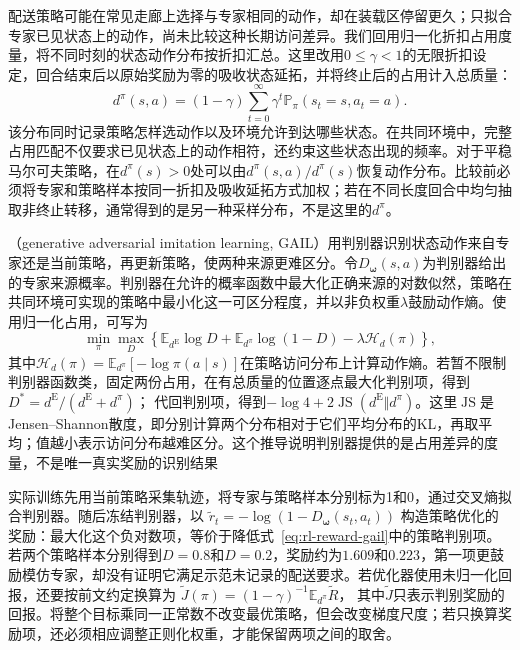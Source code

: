 配送策略可能在常见走廊上选择与专家相同的动作，却在装载区停留更久；只拟合专家已见状态上的动作，尚未比较这种长期访问差异。我们回用归一化折扣占用度量，将不同时刻的状态动作分布按折扣汇总。这里改用$0\leq\gamma<1$的无限折扣设定，回合结束后以原始奖励为零的吸收状态延拓，并将终止后的占用计入总质量：
\begin{equation}
  d^\pi(s,a)=(1-\gamma)\sum_{t=0}^{\infty}
       \gamma^t\mathbb P_\pi(s_t=s,a_t=a).
  \label{eq:rl-reward-occupancy}
\end{equation}
该分布同时记录策略怎样选动作以及环境允许到达哪些状态。在共同环境中，完整占用匹配不仅要求已见状态上的动作相符，还约束这些状态出现的频率。对于平稳马尔可夫策略，在$d^\pi(s)>0$处可以由$d^\pi(s,a)/d^\pi(s)$恢复动作分布。比较前必须将专家和策略样本按同一折扣及吸收延拓方式加权；若在不同长度回合中均匀抽取非终止转移，通常得到的是另一种采样分布，不是这里的$d^\pi$。

（generative adversarial imitation learning, GAIL）用判别器识别状态动作来自专家还是当前策略，再更新策略，使两种来源更难区分。令$D_{\bm{\omega}}(s,a)$为判别器给出的专家来源概率。判别器在允许的概率函数中最大化正确来源的对数似然，策略在共同环境可实现的策略中最小化这一可区分程度，并以非负权重$\lambda$鼓励动作熵。使用归一化占用，可写为
\begin{equation}
  \min_\pi\max_D
  \left\{\mathbb E_{d^{\mathrm E}}\log D
    +\mathbb E_{d^\pi}\log(1-D)
    -\lambda\mathcal H_d(\pi)\right\},
  \label{eq:rl-reward-gail}
\end{equation}
其中$\mathcal H_d(\pi)=\mathbb E_{d^\pi}[-\log\pi(a\mid s)]$在策略访问分布上计算动作熵。若暂不限制判别器函数类，固定两份占用，在有总质量的位置逐点最大化判别项，得到
$D^*=d^{\mathrm E}/(d^{\mathrm E}+d^\pi)$；
代回判别项，得到$-\log4+2\operatorname{JS}(d^{\mathrm E}\Vert d^\pi)$。这里$\operatorname{JS}$是Jensen--Shannon散度，即分别计算两个分布相对于它们平均分布的KL，再取平均；值越小表示访问分布越难区分。这个推导说明判别器提供的是占用差异的度量，不是唯一真实奖励的识别结果

实际训练先用当前策略采集轨迹，将专家与策略样本分别标为1和0，通过交叉熵拟合判别器。随后冻结判别器，以
$\widetilde r_t=-\log(1-D_{\bm{\omega}}(s_t,a_t))$
构造策略优化的奖励：最大化这个负对数项，等价于降低式~\eqref{eq:rl-reward-gail}中的策略判别项。若两个策略样本分别得到$D=0.8$和$D=0.2$，奖励约为$1.609$和$0.223$，第一项更鼓励模仿专家，却没有证明它满足示范未记录的配送要求。若优化器使用未归一化回报，还要按前文约定换算为
$\widetilde J(\pi)=(1-\gamma)^{-1}\mathbb E_{d^\pi}\widetilde R$，
其中$\widetilde J$只表示判别奖励的回报。将整个目标乘同一正常数不改变最优策略，但会改变梯度尺度；若只换算奖励项，还必须相应调整正则化权重，才能保留两项之间的取舍。

